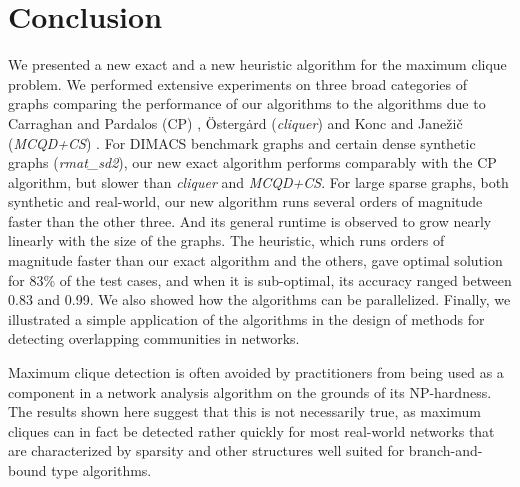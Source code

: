 \section{Conclusion}
\label{sec:conclusion}

We presented a new exact and a new heuristic algorithm for the maximum clique problem.
We performed extensive experiments on three broad categories of graphs comparing the 
performance of our algorithms to the algorithms due to
Carraghan and Pardalos (CP) \cite{pardalos},
\"{O}sterg\.{a}rd ({\it cliquer}) \cite{ostergard} and
Konc and Jane\v{z}i\v{c} ({\it MCQD+CS}) \cite{konc2007improved}.
For DIMACS benchmark graphs and certain dense synthetic graphs ({\it rmat\_sd2}), our new exact algorithm performs comparably with the CP algorithm, but slower than {\it cliquer}
and {\it MCQD+CS}. 
For large sparse graphs, both synthetic and real-world, our new algorithm runs
several orders of magnitude faster than the other three. 
And its general runtime is observed to grow nearly linearly with the size of the graphs. 
The heuristic, which runs orders of magnitude faster than our exact algorithm and the others, gave optimal solution for 83\% of the test cases, and when it is sub-optimal, its accuracy ranged between 0.83 and 0.99.
We also showed how the algorithms can be parallelized. Finally, we illustrated a simple application of the algorithms in the design of methods for detecting overlapping communities in networks. 

Maximum clique detection is often avoided by practitioners from being used as a component in 
a network analysis algorithm on the grounds of its NP-hardness. The results shown here suggest that this is not necessarily true, as maximum cliques can in fact be detected rather quickly for most real-world networks that are characterized by sparsity and other structures well suited for branch-and-bound type algorithms.


